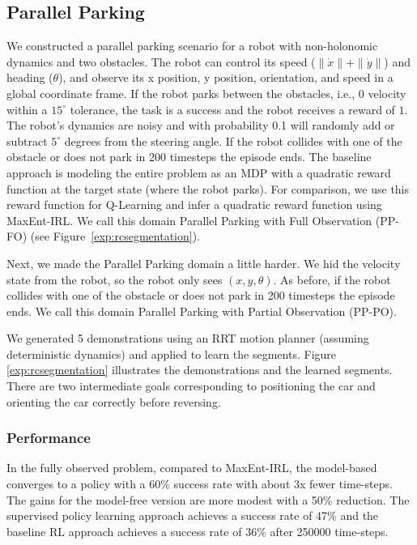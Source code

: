 \subsection{Parallel Parking}\label{exp:pp}
We constructed a parallel parking scenario for a robot with non-holonomic dynamics and two obstacles. The robot can control its speed ($\|\dot{x}\|+\|\dot{y}\|$) and heading ($\theta$), and observe its x position, y position, orientation, and speed in a global coordinate frame.
If the robot parks between the obstacles, i.e., 0 velocity within a $15^\circ$ tolerance, the task is a success and the robot receives a reward of $1$. 
The robot's dynamics are noisy and with probability 0.1 will randomly add or subtract $5^\circ$ degrees from the steering angle.
If the robot collides with one of the obstacle or does not park in 200 timesteps the episode ends. 
The baseline approach is modeling the entire problem as an MDP with a quadratic reward function at the target state (where the robot parks).
For comparison, we use this reward function for Q-Learning and infer a quadratic reward function using MaxEnt-IRL.
We call this domain Parallel Parking with Full Observation (PP-FO) (see Figure~\ref{exp:rcsegmentation}).

Next, we made the  Parallel Parking domain a little harder. We hid the velocity state from the robot, so the robot only sees $(x,y,\theta)$. As before, if the robot collides with one of the obstacle or does not park in 200 timesteps the episode ends.
We call this domain Parallel Parking with Partial Observation (PP-PO).

We generated 5 demonstrations using an RRT motion planner (assuming deterministic dynamics) and applied \hirl to learn the segments.
Figure \ref{exp:rcsegmentation} illustrates the demonstrations and the learned segments. There are two intermediate goals corresponding to positioning the car and orienting the car correctly before reversing.


\subsubsection{Performance}\label{exp:ppc} 
In the fully observed problem, compared to MaxEnt-IRL, the model-based \hirl converges to a policy with a 60\% success rate with about 3x fewer time-steps.
The gains for the model-free version are more modest with a 50\% reduction.
The supervised policy learning approach achieves a success rate of 47\% and the baseline RL approach achieves a success rate of 36\% after 250000 time-steps.

